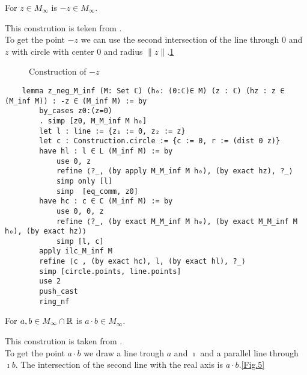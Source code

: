 \begin{lemma}
    \label{lem:construction_neg}
    \leanok
    For $z \in M_{\infty}$ is $-z \in M_{\infty}$.
\end{lemma}
This constrution is teken from \cite{JAN_SCHROEER:2023}.\\
To get the point $-z$ we can use the second intersection of the line through $0$ and $z$ with circle with center $0$ and radius $\|z\|$.\ref{Fig.1}

\begin{figure}[h!]
    \centering
    \caption{Construction of $-z$}
    \label{Fig.1}
\end{figure}

\begin{lstlisting}
    lemma z_neg_M_inf (M: Set ℂ) (h₀: (0:ℂ)∈ M) (z : ℂ) (hz : z ∈ (M_inf M)) : -z ∈ (M_inf M) := by
        by_cases z0:(z=0)
        . simp [z0, M_M_inf M h₀]
        let l : line := {z₁ := 0, z₂ := z}
        let c : Construction.circle := {c := 0, r := (dist 0 z)}
        have hl : l ∈ L (M_inf M) := by
            use 0, z
            refine ⟨?_, (by apply M_M_inf M h₀), (by exact hz), ?_⟩
            simp only [l]
            simp  [eq_comm, z0]
        have hc : c ∈ C (M_inf M) := by
            use 0, 0, z
            refine ⟨?_, (by exact M_M_inf M h₀), (by exact M_M_inf M h₀), (by exact hz)⟩
            simp [l, c]
        apply ilc_M_inf M
        refine ⟨c , (by exact hc), l, (by exact hl), ?_⟩
        simp [circle.points, line.points]
        use 2
        push_cast
        ring_nf
\end{lstlisting}

\begin{lemma}
    \label{lem:construction_mul}
    \leanok
    For $a, b \in M_{\infty}\cap\mathbb{R}$ is $a \cdot b \in M_{\infty}$.
\end{lemma}
This constrution is taken from \cite{cox2012galois}.\\
To get the point $a\cdot b$ we draw a line trough $a$ and $\imath$ and a parallel line through $\imath b$. The intersection of the second line with the real axis is $a\cdot b$.\ref{Fig.5} 

